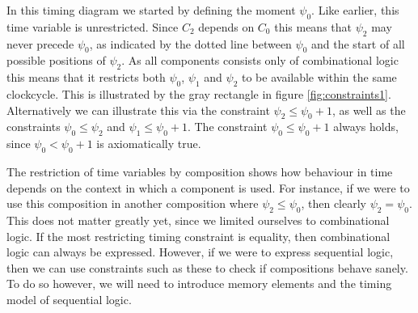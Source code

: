 In this timing diagram we started by defining the moment $\psi_0$.
Like earlier, this time variable is unrestricted.
Since $C_2$ depends on $C_0$ this means that $\psi_2$ may never precede $\psi_0$, as indicated by the dotted line between $\psi_0$ and the start of all possible positions of $\psi_2$.
As all components consists only of combinational logic this means that it restricts both $\psi_0$, $\psi_1$ and $\psi_2$ to be available within the same clockcycle.
This is illustrated by the gray rectangle in figure \ref{fig:constraints1}.
Alternatively we can illustrate this via the constraint $\psi_2 \le \psi_0 + 1$, as well as the constraints $\psi_0 \le \psi_2$ and $\psi_1 \le \psi_0 + 1$. 
The constraint $\psi_0 \le \psi_0 + 1$ always holds, since $\psi_0 < \psi_0 + 1$ is axiomatically true.

The restriction of time variables by composition shows how behaviour in time depends on the context in which a component is used.
For instance, if we were to use this composition in another composition where $\psi_2 \le \psi_0$, then clearly $\psi_2 = \psi_0$. 
This does not matter greatly yet, since we limited ourselves to combinational logic.
If the most restricting timing constraint is equality, then combinational logic can always be expressed.
However, if we were to express sequential logic, then we can use constraints such as these to check if compositions behave sanely.
To do so however, we will need to introduce memory elements and the timing model of sequential logic.

%


